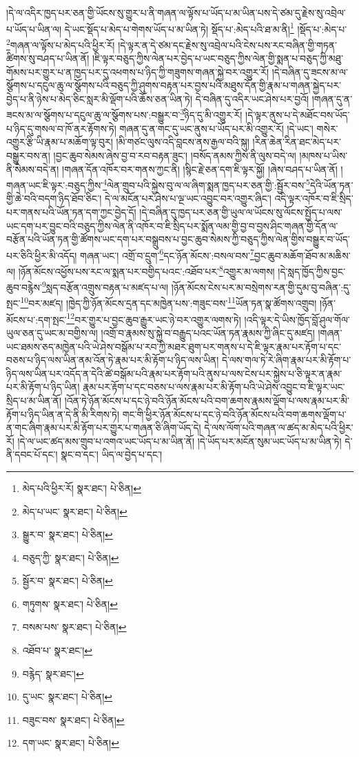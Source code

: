 །དེ་ལ་འདིར་ཁྱད་པར་ཅན་གྱི་ཡོངས་སུ་གྱུར་པ་ནི་གཞན་ལ་ལྟོས་པ་ཡོད་པ་མ་ཡིན་པས་དེ་ཙམ་དུ་རྗེས་སུ་འབྲེལ་པ་ཡོད་པ་ཡིན་ལ། དེ་ཡང་སྡོད་པ་མེད་པ་གེགས་ཡོད་པ་མ་ཡིན་ཏེ། སྡོད་པ་:མེད་པའི་ཐ་མ་ནི།\footnote{མེད་པའི་ཕྱིར་རོ།  སྣར་ཐང་།  པེ་ཅིན། } །སྡོད་པ་:མེད་པ་\footnote{མེད་པ་ཡང་  སྣར་ཐང་།  པེ་ཅིན། }གཞན་ལ་ལྟོས་པ་མེད་པའི་ཕྱིར་རོ། །དེ་ལྟར་ན་དེ་ཙམ་དང་རྗེས་སུ་འབྲེལ་པའི་ངེས་པས་རང་བཞིན་གྱི་གཏན་ཚིགས་སུ་བཤད་པ་ཡིན་ནོ། །ཇི་ལྟར་བཅུད་ཀྱིས་ལེན་པར་བྱེད་པ་ཡང་བཅུད་ཀྱིས་ལེན་གྱི་སྨན་པ་བཅུད་ཀྱི་མཐུ་གོམས་པར་གྱུར་པ་ན་ཁྱད་པར་དུ་འཕགས་པ་ཉིད་ཀྱི་གཟུགས་གཞན་སྐྱེ་བར་འགྱུར་རོ། །དེ་བཞིན་དུ་ཟངས་མ་ལ་སྩོགས་པ་དངུལ་ཆུ་ལ་སྩོགས་པའི་བཅུད་ཀྱི་ཤུགས་བརྟན་པར་བྱས་པའི་མཐུས་དོན་གྱི་རྣམ་པ་གཞན་སྐྱེད་པར་བྱེད་པ་ནི་ཉེས་པ་མེད་ཅིང་སླར་མི་ལྡོག་པའི་ཆོས་ཅན་ཡིན་ཏེ། དེ་བཞིན་དུ་འདིར་ཡང་ཤེས་པར་བྱའོ། །གཞན་དུ་ན་ཟངས་མ་ལ་སྩོགས་པ་དངུལ་ཆུ་ལ་སྩོགས་པས་:བསྒྱུར་བ་\footnote{སྒྱུར་བ་  སྣར་ཐང་།  པེ་ཅིན། }ཉིད་དུ་མི་འགྱུར་རོ། །དེ་ལྟར་ནུས་པ་དེ་མཐོང་བས་ཡོད་པ་ཉིད་དུ་གསལ་བ་ཁོ་ནར་རྟོགས་ཏེ། གཞན་དུ་ན་གང་དུ་ཡང་ནུས་པ་ཡོད་པར་མི་འགྱུར་རོ། །དེ་ཡང་། གསེར་འགྱུར་རྩི་ཡི་རྣམ་པ་མཆོག་ལྟ་བུར། །མི་གཙང་ལུས་འདི་བླངས་ནས་རྒྱལ་བའི་སྐུ། །རིན་ཆེན་རིན་ཐང་མེད་པར་བསྒྱུར་བས་ན། །བྱང་ཆུབ་སེམས་ཞེས་བྱ་བ་རབ་བརྟན་ཟུང་། །བསོད་ནམས་ཀྱིས་ནི་ལུས་བདེ་ལ། །མཁས་པ་ཡིས་ནི་སེམས་བདེ་ན། །གཞན་དོན་འཁོར་བར་གནས་ཀྱང་ནི། །སྙིང་རྗེ་ཅན་དག་ཇི་ལྟར་སྐྱོ། །ཞེས་བཤད་པ་ཡིན་ནོ། །གཞན་ཡང་ཇི་ལྟར་:བཅུད་ཀྱིས་\footnote{བཅུད་ཀྱི་  སྣར་ཐང་།  པེ་ཅིན། }ལེན་གྲུབ་པའི་སྐྱེས་བུ་ལ་ལ་ཞིག་སྨན་ཁྱད་པར་ཅན་གྱི་:སྦྱོར་བས་\footnote{སྦྱོར་བ་  སྣར་ཐང་།  པེ་ཅིན། }དེའི་ཡོན་ཏན་གྱི་ཆེ་བའི་བདག་ཉིད་ཐོབ་ཅིང་། དེ་ལ་མངོན་པར་ཤེས་པ་ལྔ་ཡང་འབྱུང་བར་འགྱུར་ཞིང་། འདི་ལྟར་འཁོར་བ་ཇི་སྲིད་པར་གནས་པའི་ཡོན་ཏན་དག་ཀྱང་བྱེད་དོ། །དེ་བཞིན་དུ་ཁྱད་པར་ཅན་གྱི་ཡུལ་ལ་ཡོངས་སུ་ལོངས་སྤྱོད་པ་ལས་ཡང་དག་པར་བྱུང་བའི་བཅུད་ཀྱིས་ལེན་ནི་འཁོར་བ་ཇི་སྲིད་པར་སྨོན་ལམ་གྱི་བྱ་བ་བྱས་ཤིང་གཞན་གྱི་དོན་ལ་བརྩོན་པའི་ཡོན་ཏན་གྱི་ཚོགས་ཡང་དག་པར་བསྒྲུབས་པ་བྱང་ཆུབ་སེམས་ཀྱི་བཅུད་ཀྱིས་ལེན་གྱིས་བསྒྱུར་བ་ཡོད་པར་ཅིའི་ཕྱིར་མི་འདོད། གཞན་ཡང་། འགྲོ་བ་དྲུག་\footnote{གཏུགས་  སྣར་ཐང་།  པེ་ཅིན། }དང་ཉོན་མོངས་:བསལ་བས་\footnote{བསམ་པས་  སྣར་ཐང་།  པེ་ཅིན། }བྱང་ཆུབ་མཆོག་ཐོབ་མ་མཆིས་ལ། །ཉོན་མོངས་འཕྱོས་པས་རང་ལ་སྨན་པར་བགྱིད་པའང་:འཐོབ་པར་\footnote{འཐོབ་པ་  སྣར་ཐང་། }འགྱུར་མ་ལགས། །དེ་སླད་ཁྱོད་ཀྱིས་བྱང་ཆུབ་བརྙེས་\footnote{བརྙེད་  སྣར་ཐང་། }སླད་བརྩོན་འགྲུས་བརྟན་པ་མཛད་པ་ལ། །ཉོན་མོངས་ངེས་པར་མ་བསྲེགས་རན་གྱི་དུམ་བུ་བཞིན་:དུ་སྤང་\footnote{དུ་ཡང་  སྣར་ཐང་།  པེ་ཅིན། }བར་མཛད། །ཁྱེད་ཀྱི་ཉོན་མོངས་དྲན་དང་མཁྱེན་པས་:གཟུང་བས་\footnote{བཟུང་བས་  སྣར་ཐང་།  པེ་ཅིན། }ཡོན་ཏན་སྣ་ཚོགས་འགྲུབ། །ཉོན་མོངས་པ་:དག་སྤང་\footnote{དག་ཡང་  སྣར་ཐང་།  པེ་ཅིན། }བར་གྱུར་པ་བྱང་ཆུབ་རྒྱུར་ཡང་ཉེ་བར་འགྱུར་ལགས་ཏེ། །འདི་ལྟར་དེ་ཡིས་ཁྱོད་བློ་ཤུལ་གོལ་ཡུལ་ཅན་དུ་ཡང་མ་བགྱིས་ལ། །འགྲོ་བ་རྣམས་སུ་སྐྱེ་བ་བརྒྱུད་པའང་ཡོན་ཏན་རྣམས་ཀྱི་ཞིང་དུ་མཛད། །གཞན་ཡང་ཐམས་ཅད་མཁྱེན་པའི་ཡེ་ཤེས་བསྒོམ་པ་རབ་ཀྱི་མཐར་ཐུག་པར་གནས་པ་དེ་ཇི་ལྟར་རྣམ་པར་རྟོག་པ་དང་བཅས་པ་ཉིད་ལས་ཡིན་ནམ་འོན་ཏེ་རྣམ་པར་མི་རྟོག་པ་ཉིད་ལས་ཡིན། དེ་ལས་གལ་ཏེ་རེ་ཞིག་རྣམ་པར་མི་རྟོག་པ་ཉིད་ལས་ཡིན་པར་འདོད་ན་དེའི་ཚེ་བསྒོམ་པའི་རྣམ་པར་རྟོག་པའི་ནུས་པ་ལས་ངེས་པར་སྐྱེས་པ་ཅི་ལྟར་ན་རྣམ་པར་མི་རྟོག་པ་ཉིད་ཡིན། རྣམ་པར་རྟོག་པ་དང་བཅས་པ་ལས་རྣམ་པར་མི་རྟོག་པའི་ཡེ་ཤེས་འབྱུང་བ་ཇི་ལྟར་ཡང་སྲིད་པ་མ་ཡིན་ནོ། །འོན་ཏེ་ཉོན་མོངས་པ་དང་ཉེ་བའི་ཉོན་མོངས་པའི་བག་ཆགས་རྣམས་ལྡོག་པ་ལས་རྣམ་པར་མི་རྟོག་པ་ཉིད་ཡིན་ན་དེ་ནི་མི་རིགས་ཏེ། གང་གི་ཕྱིར་ཉོན་མོངས་པ་དང་ཉེ་བའི་ཉོན་མོངས་པའི་བག་ཆགས་ལྡོག་པ་ན་གང་ཞིག་རྣམ་པར་མི་རྟོག་པར་གྱུར་པ་གཞན་ཅི་ཞིག་ཡོད་དེ། དེ་ལས་ལོག་པའི་གཞན་ལ་ཚད་མ་མེད་པའི་ཕྱིར་རོ། །དེ་ལ་ཡང་ཚད་མས་གྲུབ་པ་འགའ་ཡང་ཡོད་པ་མ་ཡིན་ནོ། །དེ་ཡོད་པར་མངོན་སུམ་ཡང་ཡོད་པ་མ་ཡིན་ཏེ། དེ་ནི་དབང་པོ་དང་། སྣང་བ་དང་། ཡིད་ལ་བྱེད་པ་དང་། 